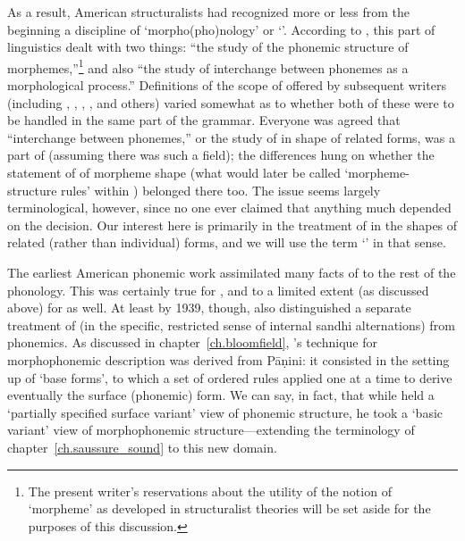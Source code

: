 As a result, American structuralists had recognized more or less from
the beginning a discipline of `morpho(pho)nology' or
`'. According to \citet{swadesh34:phoneme}, this part
of linguistics dealt with two things: ``the study of the phonemic
structure of morphemes,''\footnote{The present writer's reservations
  about the utility of the notion of `morpheme' as developed in
  structuralist theories \citep{sra12:the-morpheme} will be set aside
  for the purposes of this discussion.} and also ``the study of
interchange between phonemes as a morphological process.'' Definitions
of the scope of  offered by subsequent writers
(including {\Bloch}, {\Harris}, {\Hockett}, {\Wells}, and others) varied somewhat
as to whether both of these were to be handled in the same part of the
grammar. Everyone was agreed that ``interchange between phonemes,'' or
the study of  in shape of related forms, was a
part of  (assuming there was such a field); the
differences hung on whether the statement of  of morpheme
shape (what would later be called `morpheme-structure rules' within
) belonged there too. The issue seems largely
terminological, however, since no one ever claimed that anything much
depended on the decision. Our interest here is primarily in the
treatment of  in the shapes of related (rather than
individual) forms, and we will use the term `' in that
sense.

The earliest American phonemic work assimilated many facts of
 to the rest of the phonology. This was
certainly true for {\Sapir}, and to a limited extent (as
discussed above) for {\Bloomfield} as well. At least by 1939, though,
{\Bloomfield} also distinguished a separate treatment of 
(in the specific, restricted sense of internal sandhi alternations)
from phonemics. As discussed in chapter~\ref{ch.bloomfield},
{\Bloomfield}'s technique for morphophonemic description was derived from
Pāṇini: it consisted in the setting up of `base forms', to which a set
of ordered rules applied one at a time to derive eventually the
surface (phonemic) form. We can say, in fact, that while {\Bloomfield}
held a `partially specified surface variant' view of phonemic
structure, he took a `basic variant' view of morphophonemic
structure—extending the terminology of chapter~\ref{ch.saussure_sound}
to this new domain.

